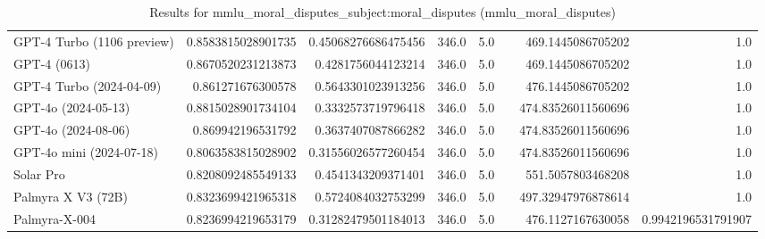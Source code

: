 \begin{table}[htp]
{\begin{tabular}{lrrrrrrr}
GPT-4 Turbo (1106 preview) & 0.8583815028901735 & 0.45068276686475456 & 346.0 & 5.0 &  & 469.1445086705202 & 1.0 \\
GPT-4 (0613) & 0.8670520231213873 & 0.4281756044123214 & 346.0 & 5.0 &  & 469.1445086705202 & 1.0 \\
GPT-4 Turbo (2024-04-09) & 0.861271676300578 & 0.5643301023913256 & 346.0 & 5.0 &  & 476.1445086705202 & 1.0 \\
GPT-4o (2024-05-13) & 0.8815028901734104 & 0.3332573719796418 & 346.0 & 5.0 &  & 474.83526011560696 & 1.0 \\
GPT-4o (2024-08-06) & 0.869942196531792 & 0.3637407087866282 & 346.0 & 5.0 &  & 474.83526011560696 & 1.0 \\
GPT-4o mini (2024-07-18) & 0.8063583815028902 & 0.31556026577260454 & 346.0 & 5.0 &  & 474.83526011560696 & 1.0 \\
Solar Pro & 0.8208092485549133 & 0.4541343209371401 & 346.0 & 5.0 &  & 551.5057803468208 & 1.0 \\
Palmyra X V3 (72B) & 0.8323699421965318 & 0.5724084032753299 & 346.0 & 5.0 &  & 497.32947976878614 & 1.0 \\
Palmyra-X-004 & 0.8236994219653179 & 0.31282479501184013 & 346.0 & 5.0 &  & 476.1127167630058 & 0.9942196531791907 \\
\bottomrule
\end{tabular}}
\caption{Results for mmlu_moral_disputes_subject:moral_disputes (mmlu_moral_disputes)}
\label{fig:mmlu_moral_disputes_subject:moral_disputes (mmlu_moral_disputes)}
\end{table}